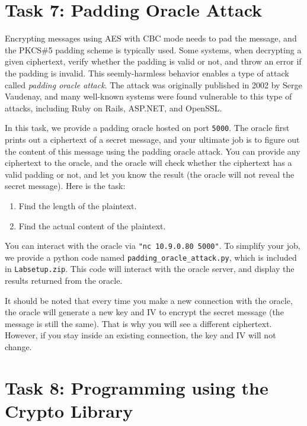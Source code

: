 \section{Task 7: Padding Oracle Attack}

Encrypting messages using AES with CBC mode needs to
pad the message, and the PKCS\#5 padding scheme is typically used.
Some systems, when decrypting a given ciphertext,
verify whether the padding is valid or not,  
and throw an error if the padding is invalid. This 
seemly-harmless behavior enables a type of attack 
called \textit{padding oracle attack}.
The attack was originally published in 2002 by Serge Vaudenay, and 
many well-known systems were found vulnerable to this type of 
attacks, including Ruby on Rails, ASP.NET, and OpenSSL. 


In this task, we provide a padding oracle hosted on port \texttt{5000}.
The oracle first prints out a ciphertext of a secret message,
and your ultimate job is to figure out the content of this message 
using the padding oracle attack. 
You can provide any ciphertext to the oracle, and the
oracle will check whether the ciphertext has a valid padding or not, and 
let you know the result (the oracle will not reveal the 
secret message). Here is the task:

\begin{enumerate}
  \item Find the length of the plaintext.
  \item Find the actual content of the plaintext.
\end{enumerate}

You can interact with the oracle via \texttt{"nc 10.9.0.80 5000"}.
To simplify your job, we provide a python code named \texttt{padding\_oracle\_attack.py},
which is included in \texttt{Labsetup.zip}. 
This code will interact with the oracle server, and display the results
returned from the oracle.  

It should be noted that every time you make a new connection with the 
oracle, the oracle will generate a new key and IV to encrypt the 
secret message (the message is still the same). That is why
you will see a different ciphertext. 
However, if you stay inside an existing connection, 
the key and IV will not change. 


\section{Task 8: Programming using the Crypto Library}

